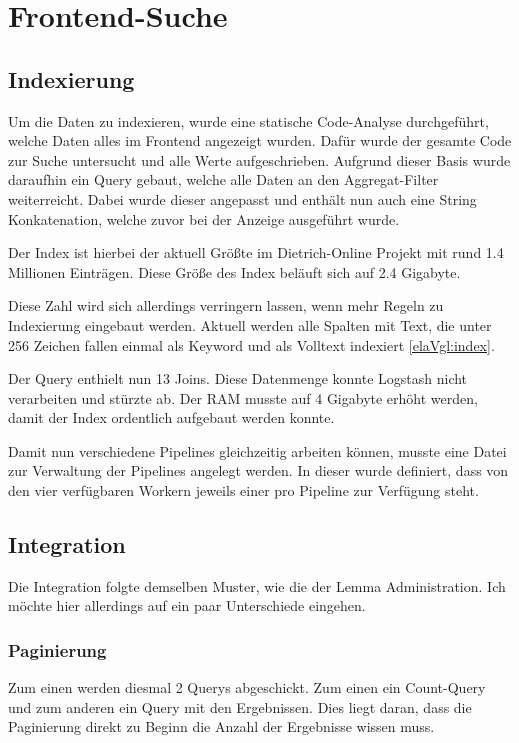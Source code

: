 \chapter{Frontend-Suche}

\section{Indexierung}

Um die Daten zu indexieren, wurde eine statische Code-Analyse durchgeführt, welche Daten alles im Frontend angezeigt wurden. Dafür wurde der gesamte Code zur Suche untersucht und alle Werte aufgeschrieben. Aufgrund dieser Basis wurde daraufhin ein Query gebaut, welche alle Daten an den Aggregat-Filter weiterreicht. Dabei wurde dieser angepasst und enthält nun auch eine String Konkatenation, welche zuvor bei der Anzeige ausgeführt wurde.

Der Index ist hierbei der aktuell Größte im Dietrich-Online Projekt mit rund 1.4 Millionen Einträgen. Diese Größe des Index beläuft sich auf 2.4 Gigabyte.

Diese Zahl wird sich allerdings verringern lassen, wenn mehr Regeln zu Indexierung eingebaut werden. Aktuell werden alle Spalten mit Text, die unter 256 Zeichen fallen einmal als Keyword und als Volltext indexiert \ref{elaVgl:index}.

Der Query enthielt nun 13 Joins. Diese Datenmenge konnte Logstash nicht verarbeiten und stürzte ab. Der RAM musste auf 4 Gigabyte erhöht werden, damit der Index ordentlich aufgebaut werden konnte.

Damit nun verschiedene Pipelines gleichzeitig arbeiten können, musste eine Datei zur Verwaltung der Pipelines angelegt werden. In dieser wurde definiert, dass von den vier verfügbaren Workern jeweils einer pro Pipeline zur Verfügung steht. 

\section{Integration}

Die Integration folgte demselben Muster, wie die der Lemma Administration. Ich möchte hier allerdings auf ein paar Unterschiede eingehen. 



\subsection{Paginierung}
Zum einen werden diesmal 2 Querys abgeschickt. Zum einen ein Count-Query und zum anderen ein Query mit den Ergebnissen. Dies liegt daran, dass die Paginierung direkt zu Beginn die Anzahl der Ergebnisse wissen muss. 


